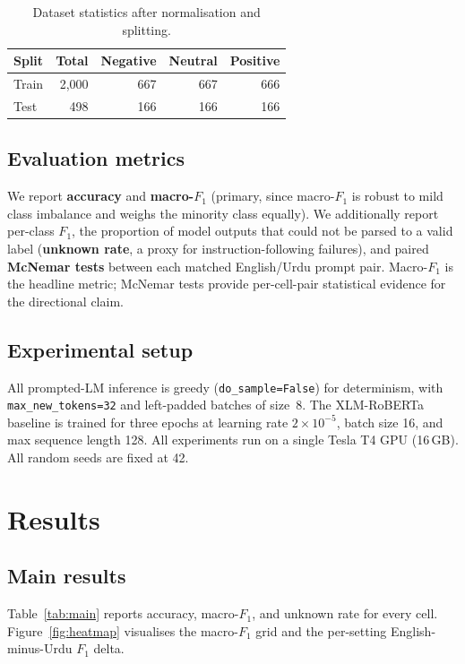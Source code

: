 \documentclass[conference]{IEEEtran}
\begin{document}
\begin{table}[t]
\centering
\caption{Dataset statistics after normalisation and splitting.}
\label{tab:data}
\begin{tabular}{lrrrr}
\toprule
Split & Total & Negative & Neutral & Positive \\
\midrule
Train & 2,000 & 667 & 667 & 666 \\
Test  &   498 & 166 & 166 & 166 \\
\bottomrule
\end{tabular}
\end{table}

\subsection{Evaluation metrics}
We report \textbf{accuracy} and \textbf{macro-$F_1$} (primary, since
macro-$F_1$ is robust to mild class imbalance and weighs the minority
class equally). We additionally report per-class $F_1$, the proportion
of model outputs that could not be parsed to a valid label
(\textbf{unknown rate}, a proxy for instruction-following failures),
and paired \textbf{McNemar tests} \cite{dietterich1998approximate}
between each matched English/Urdu prompt pair. Macro-$F_1$ is the
headline metric; McNemar tests provide per-cell-pair statistical evidence
for the directional claim.

\subsection{Experimental setup}
All prompted-LM inference is greedy (\texttt{do\_sample=False}) for
determinism, with \texttt{max\_new\_tokens=32} and left-padded batches
of size~8. The XLM-RoBERTa baseline is trained for three epochs at
learning rate $2\times 10^{-5}$, batch size 16, and max sequence length
128. All experiments run on a single Tesla T4 GPU (16\,GB). All random
seeds are fixed at 42.

\section{Results}

\subsection{Main results}
Table~\ref{tab:main} reports accuracy, macro-$F_1$, and unknown rate for
every cell. Figure~\ref{fig:heatmap} visualises the macro-$F_1$ grid and
the per-setting English-minus-Urdu $F_1$ delta.
\end{document}
